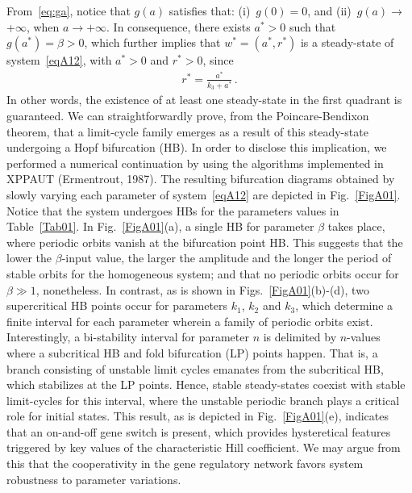 \documentclass[%
 preprint,
 aip, 
 amsmath,amssymb,
]{revtex4-2}
\begin{document}
	{From~\eqref{eq:ga}, notice that $g(a)$ satisfies that: (i)~$g(0) = 0$, and (ii)~$g(a)\rightarrow$ +$\infty$, when  $a\rightarrow +\infty$. In consequence, there exists $a^*>0$ such that $g(a^*) = \beta> 0 $, which further implies that $w^*=(a^*, r^*)$ is a steady-state of system~\eqref{eqA12}, with $a^* >0$ and $r^*>0$, since }
	\begin{gather*}
	r^* = \frac{a^*}{k_3+a^*}\,.
	\end{gather*}
	In other words, the existence of at least one steady-state in the first quadrant is guaranteed. We can straightforwardly  prove, from the Poincare-Bendixon theorem, that a limit-cycle family emerges as a result of this steady-state undergoing a Hopf bifurcation (HB). In order to disclose this implication, we performed a numerical continuation by using the algorithms implemented in XPPAUT (Ermentrout, 1987). The resulting bifurcation diagrams obtained by slowly varying each parameter of system~\eqref{eqA12} are depicted in Fig.~\ref{FigA01}. Notice that the system undergoes HBs for  the parameters values in Table~\ref{Tab01}. In Fig.~\ref{FigA01}(a), a single HB for parameter $\beta$ takes place, where periodic orbits vanish at the bifurcation point HB. This suggests that the lower the $\beta$-input value, the larger the amplitude and the longer the period of stable orbits for the homogeneous system; and that no periodic orbits occur for $\beta\gg1$, nonetheless. In contrast, as is shown in Figs.~\ref{FigA01}(b)-(d), two supercritical HB points occur for parameters $k_1$, $k_2$ and $k_3$, which determine a finite interval for each parameter wherein a family of periodic orbits exist. Interestingly, a bi-stability interval for parameter $n$ is delimited by $n$-values where a subcritical HB and fold bifurcation (LP) points happen. That is, a branch consisting of unstable limit cycles emanates from the subcritical HB, which stabilizes at the LP points. Hence, stable steady-states coexist with stable limit-cycles for this interval, where the unstable periodic branch plays a critical role for initial states. This result, as is depicted in Fig.~\ref{FigA01}(e), indicates that an on-and-off gene switch is present, which provides hysteretical features triggered by key values of the characteristic Hill coefficient. We may argue from this that the cooperativity in the gene regulatory network favors system robustness to parameter variations.
	
\end{document}
